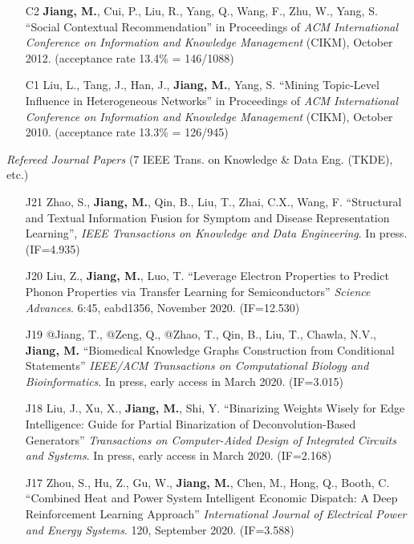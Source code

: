 \documentclass[10pt]{article}
\newenvironment{myindentpar}[1]%
{\begin{list}{}%
         {\setlength{\leftmargin}{#1}}%
         \item[]%
}
{\end{list}}
\newcounter{list}
\begin{document}
\begin{myindentpar}{0.00cm}
\begin{enumerate}[leftmargin=.5cm]
\item[C2] \textbf{Jiang, M.}, Cui, P., Liu, R., Yang, Q., Wang, F., Zhu, W., Yang, S. ``Social Contextual Recommendation'' in Proceedings of \textit{ACM International Conference on Information and Knowledge Management} (CIKM), October 2012. (acceptance rate 13.4\% = 146/1088)

\item[C1] Liu, L., Tang, J., Han, J., \textbf{Jiang, M.}, Yang, S. ``Mining Topic-Level Influence in Heterogeneous Networks'' in Proceedings of \textit{ACM International Conference on Information and Knowledge Management} (CIKM), October 2010. (acceptance rate 13.3\% = 126/945)

\end{enumerate}

\hspace{-0.25cm}\textit{Refereed Journal Papers} {\small (7 IEEE Trans. on Knowledge \& Data Eng. (TKDE), etc.)}

\begin{enumerate}[leftmargin=.5cm]

\item[J21] Zhao, S., \textbf{Jiang, M.}, Qin, B., Liu, T., Zhai, C.X., Wang, F. ``Structural and Textual Information Fusion for Symptom and Disease Representation Learning'', \textit{IEEE Transactions on Knowledge and Data Engineering}. In press. (IF=4.935)
		
\item[J20] Liu, Z., \textbf{Jiang, M.}, Luo, T. ``Leverage Electron Properties to Predict Phonon Properties via Transfer Learning for Semiconductors'' \textit{Science Advances}. 6:45, eabd1356, November 2020. (IF=12.530)
		
\item[J19] @Jiang, T., @Zeng, Q., @Zhao, T., Qin, B., Liu, T., Chawla, N.V., \textbf{Jiang, M.} ``Biomedical Knowledge Graphs Construction from Conditional Statements'' \textit{IEEE/ACM Transactions on Computational Biology and Bioinformatics}. In press, early access in March 2020. (IF=3.015)

\item[J18] Liu, J., Xu, X., \textbf{Jiang, M.}, Shi, Y. ``Binarizing Weights Wisely for Edge Intelligence: Guide for Partial Binarization of Deconvolution-Based Generators'' \textit{Transactions on Computer-Aided Design of Integrated Circuits and Systems}. In press, early access in March 2020. (IF=2.168)

\item[J17] Zhou, S., Hu, Z., Gu, W., \textbf{Jiang, M.}, Chen, M., Hong, Q., Booth, C. ``Combined Heat and Power System Intelligent Economic Dispatch: A Deep Reinforcement Learning Approach'' \textit{International Journal of Electrical Power and Energy Systems}. 120, September 2020. (IF=3.588)


\end{enumerate}
\end{myindentpar}
\end{document}
